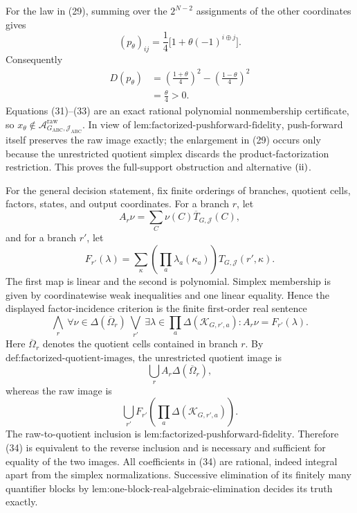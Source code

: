 For the law in (29), summing over the \(2^{N-2}\) assignments of the other coordinates gives
\[
(p_\theta)_{ij}
=\frac14\bigl[1+\theta(-1)^{i\oplus j}\bigr].
\tag{32}
\]
Consequently
\[
\begin{aligned}
D(p_\theta)
&=\left(\frac{1+\theta}{4}\right)^2
-\left(\frac{1-\theta}{4}\right)^2\\
&=\frac{\theta}{4}>0.
\end{aligned}
\tag{33}
\]
Equations (31)--(33) are an exact rational polynomial nonmembership certificate, so \(x_\theta\notin\mathcal A_{G_{\mathrm{ABC}},\mathcal J_{\mathrm{ABC}}}^{\mathrm{raw}}\).  In view of \(\text{lem:factorized-pushforward-fidelity}\), push-forward itself preserves the raw image exactly; the enlargement in (29) occurs only because the unrestricted quotient simplex discards the product-factorization restriction.  This proves the full-support obstruction and alternative \({\rm(ii)}\).

For the general decision statement, fix finite orderings of branches, quotient cells, factors, states, and output coordinates.  For a branch \(r\), let
\[
A_r\nu=\sum_C\nu(C)\overline T_{G,\mathcal J}(C),
\]
and for a branch \(r'\), let
\[
F_{r'}(\lambda)
=\sum_\kappa\left(\prod_a\lambda_a(\kappa_a)\right)
T_{G,\mathcal J}(r',\kappa).
\]
The first map is linear and the second is polynomial.  Simplex membership is given by coordinatewise weak inequalities and one linear equality.  Hence the displayed factor-incidence criterion is the finite first-order real sentence
\[
\bigwedge_r\ \forall\nu\in\Delta(\overline\Omega_r)\ 
\bigvee_{r'}\ \exists\lambda\in\prod_a\Delta(\mathcal K_{G,r',a}):
A_r\nu=F_{r'}(\lambda).
\tag{34}
\]
Here \(\overline\Omega_r\) denotes the quotient cells contained in branch \(r\).  By \(\text{def:factorized-quotient-images}\), the unrestricted quotient image is
\[
\bigcup_r A_r\Delta(\overline\Omega_r),
\]
whereas the raw image is
\[
\bigcup_{r'}F_{r'}\left(\prod_a\Delta(\mathcal K_{G,r',a})\right).
\]
The raw-to-quotient inclusion is \(\text{lem:factorized-pushforward-fidelity}\).  Therefore (34) is equivalent to the reverse inclusion and is necessary and sufficient for equality of the two images.  All coefficients in (34) are rational, indeed integral apart from the simplex normalizations.  Successive elimination of its finitely many quantifier blocks by \(\text{lem:one-block-real-algebraic-elimination}\) decides its truth exactly.


